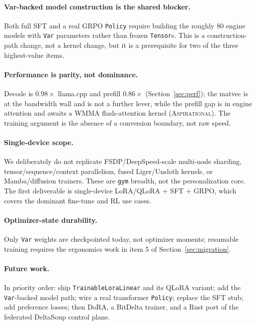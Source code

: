 \documentclass[11pt]{article}
\begin{document}
\paragraph{Var-backed model construction is the shared blocker.} Both full SFT and a real GRPO \texttt{Policy} require building the roughly $80$ engine models with \texttt{Var} parameters rather than frozen \texttt{Tensor}s. This is a construction-path change, not a kernel change, but it is a prerequisite for two of the three highest-value items.

\paragraph{Performance is parity, not dominance.} Decode is $0.98\times$ llama.cpp and prefill $0.86\times$ (Section~\ref{sec:perf}); the matvec is at the bandwidth wall and is not a further lever, while the prefill gap is in engine attention and awaits a WMMA flash-attention kernel (\textsc{Aspirational}). The training argument is the absence of a conversion boundary, not raw speed.

\paragraph{Single-device scope.} We deliberately do not replicate FSDP/DeepSpeed-scale multi-node sharding, tensor/sequence/context parallelism, fused Liger/Unsloth kernels, or Mamba/diffusion trainers. These are \texttt{gym} breadth, not the personalization core. The first deliverable is single-device LoRA/QLoRA $+$ SFT $+$ GRPO, which covers the dominant fine-tune and RL use cases.

\paragraph{Optimizer-state durability.} Only \texttt{Var} weights are checkpointed today, not optimizer moments; resumable training requires the ergonomics work in item 5 of Section~\ref{sec:migration}.

\paragraph{Future work.} In priority order: ship \texttt{TrainableLoraLinear} and its QLoRA variant; add the \texttt{Var}-backed model path; wire a real transformer \texttt{Policy}; replace the SFT stub; add preference losses; then DoRA, a BitDelta trainer, and a Rust port of the federated DeltaSoup control plane.
\end{document}
